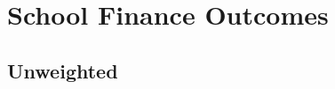 \documentclass{article}
\begin{document}
%
%
%
%
%
%
%
%
%
%
%
%
%
%
%
%
%
%
%


\section{School Finance Outcomes}
\subsection{Unweighted}


\clearpage
\end{document}
